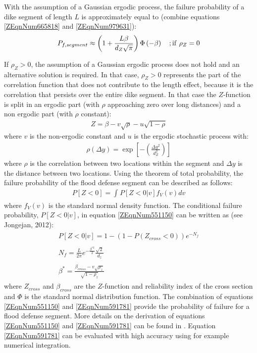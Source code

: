 {With the assumption of a Gaussian ergodic process, the failure probability of a dike segment of length $L$ is approximately equal to (combine equations \eqref{ZEqnNum665818} and \eqref{ZEqnNum979631}):
\begin{align}
P_{f,segment} \approx \left(1+\frac{L\beta }{d_{Z} \sqrt{\pi } } \right) \Phi \left(-\beta \right)\quad ;{\rm if} ~ \rho _{Z} =0\label{eq:sm3} 
\end{align}

If $\rho_Z$$>$0, the assumption of a Gaussian ergodic process does not hold and an alternative solution is required.
In that case, $\rho_Z>0$ represents the part of the correlation function that does not contribute to the length effect, because it is the correlation that persists over the entire dike segment.
In that case the $Z$-function is split in an ergodic part (with $\rho$ approaching zero over long distances) and a non ergodic part (with $\rho$ constant):
\begin{align}
Z=\beta -v\sqrt{\rho } -u\sqrt{1-\rho } \label{ZEqnNum628933} 
\end{align}
where $v$ is the non-ergodic constant and $u$ is the ergodic stochastic process with:
\begin{align}
\rho \left(\Delta y\right)=\exp \left[-\left(\frac{\Delta y^{2} }{d_{Z}^{2} } \right)\right] \label{eq:sm4} 
\end{align}
where $\rho$ is the correlation between two locations within the segment and $\Delta y$ is the distance between two locations.
Using the theorem of total probability, the failure probability of the flood defense segment can be described as follows:
\begin{align}
P\left[Z<0\right]=\int _{}^{}P\left[Z<0|v\right]f_{V} \left(v\right)dv \label{ZEqnNum551150} 
\end{align}
where $f_V(v)$ is the standard normal density function.
The conditional failure probability, $P[Z<0|v]$, in equation \eqref{ZEqnNum551150} can be written as (see Jongejan, 2012):
\begin{align}
\begin{array}{l} {P\left[Z<0|v\right]=1-\left(1-P\left(Z_{cross} <0\right)\right)e^{-N_{f} } } \\\\ {N_{f} = \displaystyle \frac{L}{2\pi } e^{-\frac{\beta^{*2} }{2} } \frac{\sqrt{2} }{d_{z} } } \\\\ {\beta^{*}= \displaystyle \frac{\beta _{cross} -v\sqrt{\rho _{z} } }{\sqrt{1-\rho _{z} } } } \end{array}\label{ZEqnNum591781} 
\end{align}
where $Z_{cross}$ and $\beta_{cross}$ are the $Z$-function and reliability index of the cross section and $\Phi$ is the standard normal distribution function.
The combination of equations \eqref{ZEqnNum551150} and \eqref{ZEqnNum591781} provide the probability of failure for a flood defense segment.
More details on the derivation of equations \eqref{ZEqnNum551150} and \eqref{ZEqnNum591781} can be found in \cite{Jongejan2012}.
Equation \eqref{ZEqnNum591781} can be evaluated with high accuracy using for example numerical integration.

}
